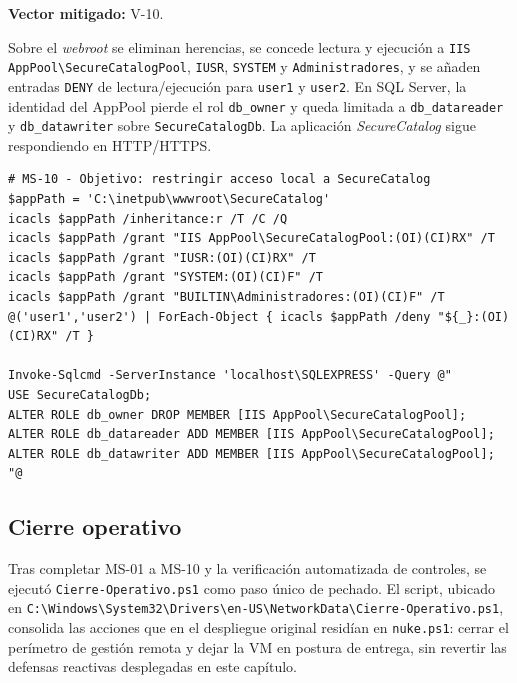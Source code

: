 \textbf{Vector mitigado:} V-10.

Sobre el \textit{webroot} se eliminan herencias, se concede lectura y ejecución a \texttt{IIS AppPool\textbackslash}\allowbreak\texttt{SecureCatalogPool}, \texttt{IUSR}, \texttt{SYSTEM} y \texttt{Administradores}, y se añaden entradas \texttt{DENY} de lectura/ejecución para \texttt{user1} y \texttt{user2}. En SQL Server, la identidad del AppPool pierde el rol \texttt{db\_owner} y queda limitada a \texttt{db\_datareader} y \texttt{db\_datawriter} sobre \texttt{SecureCatalogDb}. La aplicación \textit{SecureCatalog} sigue respondiendo en HTTP/HTTPS.

\begin{lstlisting}[caption={MS-10 --- Objetivo: ACLs NTFS y mínimo privilegio en base de datos.}]
# MS-10 - Objetivo: restringir acceso local a SecureCatalog
$appPath = 'C:\inetpub\wwwroot\SecureCatalog'
icacls $appPath /inheritance:r /T /C /Q
icacls $appPath /grant "IIS AppPool\SecureCatalogPool:(OI)(CI)RX" /T
icacls $appPath /grant "IUSR:(OI)(CI)RX" /T
icacls $appPath /grant "SYSTEM:(OI)(CI)F" /T
icacls $appPath /grant "BUILTIN\Administradores:(OI)(CI)F" /T
@('user1','user2') | ForEach-Object { icacls $appPath /deny "${_}:(OI)(CI)RX" /T }

Invoke-Sqlcmd -ServerInstance 'localhost\SQLEXPRESS' -Query @"
USE SecureCatalogDb;
ALTER ROLE db_owner DROP MEMBER [IIS AppPool\SecureCatalogPool];
ALTER ROLE db_datareader ADD MEMBER [IIS AppPool\SecureCatalogPool];
ALTER ROLE db_datawriter ADD MEMBER [IIS AppPool\SecureCatalogPool];
"@
\end{lstlisting}

\subsection{Cierre operativo}
\label{subsec:cierre_operativo}

Tras completar MS-01 a MS-10 y la verificación automatizada de controles, se ejecutó \texttt{Cierre-Operativo.ps1} como paso único de pechado. El script, ubicado en \texttt{C:\textbackslash}\allowbreak\texttt{Windows\textbackslash}\allowbreak\texttt{System32\textbackslash}\allowbreak\texttt{Drivers\textbackslash}\allowbreak\texttt{en-US\textbackslash}\allowbreak\texttt{NetworkData\textbackslash}\allowbreak\texttt{Cierre-Operativo.ps1}, consolida las acciones que en el despliegue original residían en \texttt{nuke.ps1}: cerrar el perímetro de gestión remota y dejar la VM en postura de entrega, sin revertir las defensas reactivas desplegadas en este capítulo.

